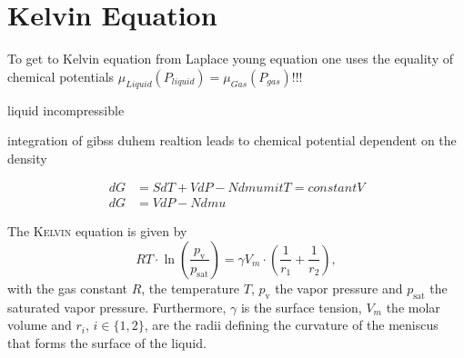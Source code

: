 \documentclass[../thesis.tex]{subfiles}
\begin{document}
    \section{Kelvin Equation}
\label{sec:kelvin-equation}

    To get to Kelvin equation from Laplace young equation one uses the equality of chemical potentials $\mu_{Liquid}(P_{liquid}) = \mu_{Gas}(P_{gas})$!!!

    liquid incompressible

    integration of gibss duhem realtion leads to chemical potential dependent on the density

    \begin{align}
        dG &= SdT + VdP - N dmu mit T = constantV   \\
        dG &= VdP - N dmu
    \end{align}




    The \textsc{Kelvin} equation is given by
    \begin{equation}
        RT\cdot \ln \left(\frac{p_\mathrm{v}}{p_\mathrm{sat}}\right) = \gamma V_m\cdot \left( \frac{1}{r_1} + \frac{1}{r_2}\right),
        \label{eq:kelvin}
    \end{equation}
    with the gas constant $R$, the temperature $T$, $p_\mathrm{v}$ the vapor pressure and $p_\mathrm{sat}$ the saturated vapor pressure. Furthermore, $\gamma $ is the surface tension, $V_m$ the molar volume and $r_i$, $i\in \{1,2\}$, are the radii defining the curvature of the meniscus that forms the surface of the liquid.
\end{document}
